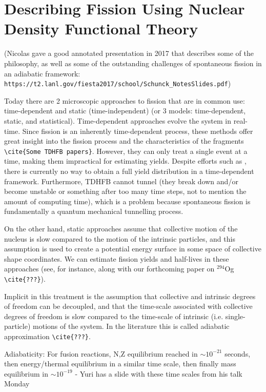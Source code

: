 \chapter{Describing Fission Using Nuclear Density Functional Theory}\label{chap:Model}

(Nicolas gave a good annotated presentation in 2017 that describes some of the philosophy, as well as some of the outstanding challenges of spontaneous fission in an adiabatic framework: \verb|https://t2.lanl.gov/fiesta2017/school/Schunck_NotesSlides.pdf|)

Today there are 2 microscopic approaches to fission that are in common use: time-dependent and static (time-independent) (or 3 models: time-dependent, static, and statistical). Time-dependent approaches evolve the system in real-time. Since fission is an inherently time-dependent process, these methods offer great insight into the fission process and the characteristics of the fragments \verb|\cite{Some TDHFB papers}|. However, they can only treat a single event at a time, making them impractical for estimating yields. Despite efforts such as \cite{Bulgac2018}, there is currently no way to obtain a full yield distribution in a time-dependent framework. Furthermore, TDHFB cannot tunnel (they break down and/or become unstable or something after too many time steps, not to mention the amount of computing time), which is a problem because spontaneous fission is fundamentally a quantum mechanical tunnelling process.

On the other hand, static approaches assume that collective motion of the nucleus is slow compared to the motion of the intrinsic particles, and this assumption is used to create a potential energy surface in some space of collective shape coordinates. We can estimate fission yields and half-lives in these approaches (see, for instance, \cite{Sadhukhan2016} along with our forthcoming paper on $^{294}$Og \verb|\cite{???}|).

Implicit in this treatment is the assumption that collective and intrinsic degrees of freedom can be decoupled, and that the time-scale associated with collective degrees of freedom is slow compared to the time-scale of intrinsic (i.e. single-particle) motions of the system. In the literature this is called adiabatic approximation \verb|\cite{???}|.

Adiabaticity: For fusion reactions, N,Z equilibrium reached in $\sim10^{-21}$ seconds, then energy/thermal equilibrium in a similar time scale, then finally mass equilibrium in $\sim10^{-19}$ - Yuri has a slide with these time scales from his talk Monday


